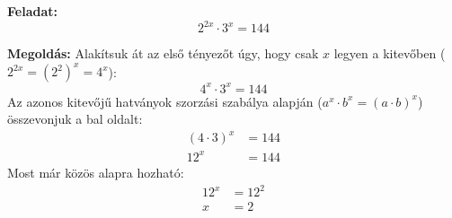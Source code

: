 \documentclass[11pt, a4paper]{article}
\begin{document}
\textbf{Feladat:}
\[ 2^{2x} \cdot 3^x = 144 \]

\textbf{Megoldás:}
Alakítsuk át az első tényezőt úgy, hogy csak $x$ legyen a kitevőben ($2^{2x} = (2^2)^x = 4^x$):
\[ 4^x \cdot 3^x = 144 \]
Az azonos kitevőjű hatványok szorzási szabálya alapján ($a^x \cdot b^x = (a \cdot b)^x$) összevonjuk a bal oldalt:
\begin{align*}
(4 \cdot 3)^x &= 144 \\
12^x &= 144
\end{align*}
Most már közös alapra hozható:
\begin{align*}
12^x &= 12^2 \\
x &= 2
\end{align*}
\end{document}
